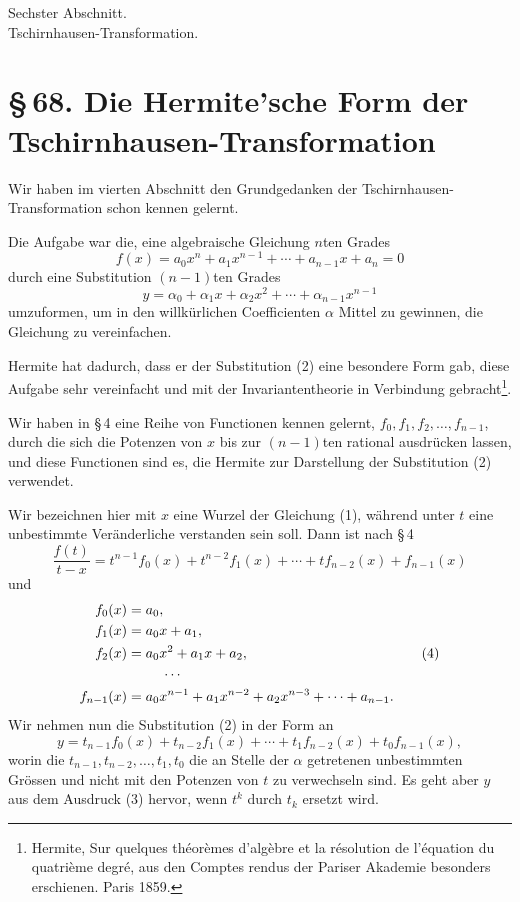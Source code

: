 \documentclass[11pt]{article}
\newcommand{\sect}[2]{\section*{\S\,#1. #2}}
\begin{document}
\begin{center}
{\large Sechster Abschnitt.}\\[0.45em]
{\Large Tschirnhausen-Transformation.}
\end{center}

\sect{68}{Die Hermite'sche Form der Tschirnhausen-Transformation}

Wir haben im vierten Abschnitt den Grundgedanken der Tschirnhausen-Transformation schon kennen gelernt.

Die Aufgabe war die, eine algebraische Gleichung $n$ten Grades
\begin{equation}
 f(x)=a_0x^n+a_1x^{n-1}+\cdots+a_{n-1}x+a_n=0
\tag{1}
\end{equation}
durch eine Substitution $(n-1)$ten Grades
\begin{equation}
 y=\alpha_0+\alpha_1x+\alpha_2x^2+\cdots+\alpha_{n-1}x^{n-1}
\tag{2}
\end{equation}
umzuformen, um in den willkürlichen Coefficienten $\alpha$ Mittel zu gewinnen, die Gleichung zu vereinfachen.

Hermite hat dadurch, dass er der Substitution (2) eine besondere Form gab, diese Aufgabe sehr vereinfacht und mit der Invariantentheorie in Verbindung gebracht\footnote{Hermite, Sur quelques théorèmes d'algèbre et la résolution de l'équation du quatrième degré, aus den Comptes rendus der Pariser Akademie besonders erschienen. Paris 1859.}.

Wir haben in \S\,4 eine Reihe von Functionen kennen gelernt, $f_0,f_1,f_2,\ldots,f_{n-1}$, durch die sich die Potenzen von $x$ bis zur $(n-1)$ten rational ausdrücken lassen, und diese Functionen sind es, die Hermite zur Darstellung der Substitution (2) verwendet.

Wir bezeichnen hier mit $x$ eine Wurzel der Gleichung (1), während unter $t$ eine unbestimmte Veränderliche verstanden sein soll. Dann ist nach \S\,4
\begin{equation}
 \frac{f(t)}{t-x}=t^{n-1}f_0(x)+t^{n-2}f_1(x)+\cdots+t f_{n-2}(x)+f_{n-1}(x)
\tag{3}
\end{equation}
und
\begin{equation}
\begin{aligned}
 f_0(x)&=a_0,\\
 f_1(x)&=a_0x+a_1,\\
 f_2(x)&=a_0x^2+a_1x+a_2,\\
 &\hspace{2.5em}\cdots\\
 f_{n-1}(x)&=a_0x^{n-1}+a_1x^{n-2}+a_2x^{n-3}+\cdots+a_{n-1}.
\end{aligned}
\tag{4}
\end{equation}
Wir nehmen nun die Substitution (2) in der Form an
\begin{equation}
 y=t_{n-1}f_0(x)+t_{n-2}f_1(x)+\cdots+t_1f_{n-2}(x)+t_0f_{n-1}(x),
\tag{5}
\end{equation}
worin die $t_{n-1},t_{n-2},\ldots,t_1,t_0$ die an Stelle der $\alpha$ getretenen unbestimmten Grössen und nicht mit den Potenzen von $t$ zu verwechseln sind. Es geht aber $y$ aus dem Ausdruck (3) hervor, wenn $t^k$ durch $t_k$ ersetzt wird.
\end{document}
